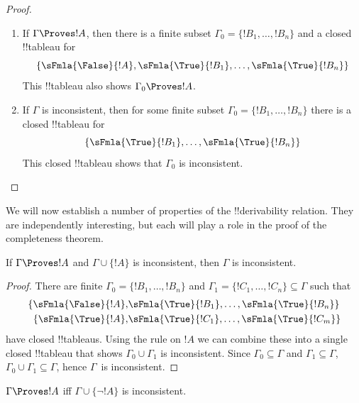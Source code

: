 \begin{proof}
  \begin{enumerate}
    \item If $\Gamma \Proves !A$, then there is a finite subset
      $\Gamma_0 = \{!B_1, \dots, !B_n\}$ and a closed !!{tableau} for
      \[
      \{\sFmla{\False}{!A}, \sFmla{\True}{!B_1}, \dots, \sFmla{\True}{!B_n}\}
      \]
      This !!{tableau} also shows $\Gamma_0 \Proves !A$.
    \item If $\Gamma$ is inconsistent, then for some finite subset
      $\Gamma_0 = \{!B_1, \dots, !B_n\}$ there is a closed !!{tableau}
      for
      \[
      \{\sFmla{\True}{!B_1}, \dots, \sFmla{\True}{!B_n}\}
      \]
      This closed !!{tableau} shows that $\Gamma_0$ is inconsistent.
  \end{enumerate}
\end{proof}







We will now establish a number of properties of the !!{derivability}
relation.  They are independently interesting, but each will play a
role in the proof of the completeness theorem.

\begin{prop}
  If $\Gamma \Proves !A$ and $\Gamma \cup \{!A\}$ is
  inconsistent, then $\Gamma$ is inconsistent.
\end{prop}

\begin{proof}
There are finite $\Gamma_0 = \{!B_1, \dots, !B_n\}$ and $\Gamma_1
  =\{!C_1, \dots, !C_n\} \subseteq \Gamma$ such that
  \begin{align*}
    \{\sFmla{\False}{!A}, &
    \sFmla{\True}{!B_1}, \dots, \sFmla{\True}{!B_n}\} \\
    \{\sFmla{\True}{!A}, &
    \sFmla{\True}{!C_1}, \dots, \sFmla{\True}{!C_m}\}
  \end{align*}
  have closed !!{tableau}s.  Using the \Cut{} rule on $!A$ we can
  combine these into a single closed !!{tableau} that shows $\Gamma_0
  \cup \Gamma_1$ is inconsistent.  Since $\Gamma_0
  \subseteq \Gamma$ and $\Gamma_1 \subseteq \Gamma$, $\Gamma_0 \cup
  \Gamma_1 \subseteq \Gamma$, hence $\Gamma$~is inconsistent.
\end{proof}

\begin{prop}
$\Gamma \Proves !A$ iff $\Gamma \cup \{\lnot !A\}$ is inconsistent.
\end{prop}

